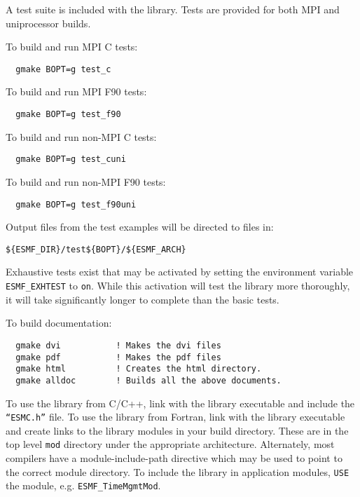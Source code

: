 A test suite is included with the library.  Tests are provided for both MPI
and uniprocessor builds. 

\noindent To build and run MPI C tests:

\begin{verbatim}
  gmake BOPT=g test_c
\end{verbatim}

\noindent To build and run MPI F90 tests:
\begin{verbatim}
  gmake BOPT=g test_f90
\end{verbatim}

\noindent To build and run non-MPI C tests:
\begin{verbatim}
  gmake BOPT=g test_cuni
\end{verbatim}

\noindent To build and run non-MPI F90 tests:
\begin{verbatim}
  gmake BOPT=g test_f90uni
\end{verbatim}

Output files from the test examples will be directed to files in:
\begin{verbatim}
${ESMF_DIR}/test${BOPT}/${ESMF_ARCH}
\end{verbatim}

Exhaustive tests exist that may be activated by setting the environment variable
{\tt ESMF\_EXHTEST} to {\tt on}.  While this activation will test the library more thoroughly,
it will take significantly longer to complete than the basic tests.

\smallskip

\noindent To build documentation:
\begin{verbatim}
  gmake dvi           ! Makes the dvi files
  gmake pdf           ! Makes the pdf files
  gmake html          ! Creates the html directory.
  gmake alldoc        ! Builds all the above documents.
\end{verbatim}

To use the library from C/C++, link with the library executable and include
the {\tt ``ESMC.h''} file.
To use the library from Fortran, link with the library executable and
create links to the library modules in your build directory.  These are
in the top level {\tt mod} directory under the appropriate architecture.  Alternately, 
most compilers have a module-include-path directive which may be used to point
to the correct module directory.
To include the library in application modules, {\tt USE} the
module, e.g. {\tt ESMF\_TimeMgmtMod}.  


